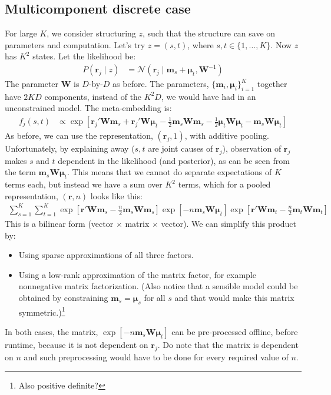 \documentclass[a4paper,oneside,12pt,english]{report}
\def\ND{\mathcal{N}}
\def\Wmat{\mathbf{W}}
\def\mvec{\mathbf{m}}
\def\rvec{\mathbf{r}}
\def\muvec{\boldsymbol{\mu}}
\begin{document}
\subsection{Multicomponent discrete case}
For large $K$, we consider structuring $z$, such that the structure can save on parameters and computation. Let's try $z=(s,t)$, where $s,t\in\{1,\ldots,K\}$. Now $z$ has $K^2$ states. Let the likelihood be:
\begin{align}
P(\rvec_j\mid z) &= \ND(\rvec_j\mid \mvec_s+\muvec_t,\Wmat^{-1})
\end{align}
The parameter $\Wmat$ is $D$-by-$D$ as before. The parameters, $\{\mvec_i,\muvec_i\}_{i=1}^K$ together have $2KD$ components, instead of the $K^2D$, we would have had in an unconstrained model. The meta-embedding is:
\begin{align}
f_j(s,t) &\propto \exp[\rvec_j'\Wmat\mvec_s + \rvec_j'\Wmat\muvec_t -\frac12\mvec_s\Wmat\mvec_s -\frac12\muvec_t\Wmat\muvec_t
- \mvec_s\Wmat\muvec_t]
\end{align}
As before, we can use the representation, $(\rvec_j,1)$, with additive pooling. Unfortunately, by explaining away ($s,t$ are joint causes of $\rvec_j$), observation of $\rvec_j$ makes $s$ and $t$ dependent in the likelihood (and posterior), as can be seen from the term $\mvec_s\Wmat\muvec_t$. This means that we cannot do separate expectations of $K$ terms each, but instead we have a sum over $K^2$ terms, which for a pooled representation, $(\rvec,n)$ looks like this:
\begin{align}
\sum_{s=1}^K\sum_{t=1}^K \exp[\rvec'\Wmat\mvec_s -\frac{n}2\mvec_s\Wmat\mvec_s] 
\exp[- n\mvec_s\Wmat\muvec_t] 
\exp[\rvec'\Wmat\mvec_t -\frac{n}2\mvec_t\Wmat\mvec_t]
\end{align}
This is a bilinear form (vector $\times$ matrix $\times$ vector). We can simplify this product by: 
\begin{itemize}
	\item Using sparse approximations of all three factors.  
	\item Using a low-rank approximation of the matrix factor, for example nonnegative matrix factorization. (Also notice that a sensible model could be obtained by constraining $\mvec_s=\muvec_s$ for all $s$ and that would make this matrix symmetric.)\footnote{Also positive definite?}
\end{itemize}
In both cases, the matrix, $\exp[- n\mvec_s\Wmat\muvec_t]$ can be pre-processed offline, before runtime, because it is not dependent on $\rvec_j$. Do note that the matrix is dependent on $n$ and such preprocessing would have to be done for every required value of $n$.
\end{document}
